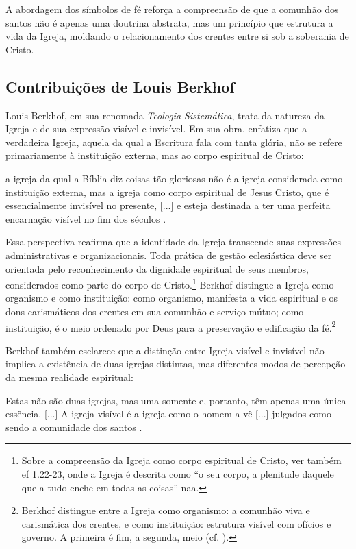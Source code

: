 A abordagem dos símbolos de fé reforça a compreensão de que a comunhão dos santos não é apenas uma doutrina abstrata, mas um princípio que estrutura a vida da Igreja, moldando o relacionamento dos crentes entre si sob a soberania de Cristo.

\subsection{Contribuições de Louis Berkhof}

Louis Berkhof, em sua renomada \textit{Teologia Sistemática}, trata da natureza da Igreja e de sua expressão visível e invisível. Em sua obra, enfatiza que a verdadeira Igreja, aquela da qual a Escritura fala com tanta glória, não se refere primariamente à instituição externa, mas ao corpo espiritual de Cristo:

\begin{citacao}
a igreja da qual a Bíblia diz coisas tão gloriosas não é a igreja considerada como instituição externa, mas a igreja como corpo espiritual de Jesus Cristo, que é essencialmente invisível no presente, [...] e esteja destinada a ter uma perfeita encarnação visível no fim dos séculos \cite[p.~644]{berkhof2012}.
\end{citacao}

Essa perspectiva reafirma que a identidade da Igreja transcende suas expressões administrativas e organizacionais. Toda prática de gestão eclesiástica deve ser orientada pelo reconhecimento da dignidade espiritual de seus membros, considerados como parte do corpo de Cristo.\footnote{Sobre a compreensão da Igreja como corpo espiritual de Cristo, ver também \gls{ef} 1.22-23, onde a Igreja é descrita como ``o seu corpo, a plenitude daquele que a tudo enche em todas as coisas'' \gls{naa}.} Berkhof distingue a Igreja como organismo e como instituição: como organismo, manifesta a vida espiritual e os dons carismáticos dos crentes em sua comunhão e serviço mútuo; como instituição, é o meio ordenado por Deus para a preservação e edificação da fé.\footnote{Berkhof distingue entre a Igreja como organismo: a comunhão viva e carismática dos crentes, e como instituição: estrutura visível com ofícios e governo. A primeira é fim, a segunda, meio (cf. \cite[p.~638]{berkhof2012}).}

Berkhof também esclarece que a distinção entre Igreja visível e invisível não implica a existência de duas igrejas distintas, mas diferentes modos de percepção da mesma realidade espiritual:

\begin{citacao}
Estas não são duas igrejas, mas uma somente e, portanto, têm apenas uma única essência. [...] A igreja visível é a igreja como o homem a vê [...] julgados como sendo a comunidade dos santos \cite[p.~642]{berkhof2012}.
\end{citacao}

